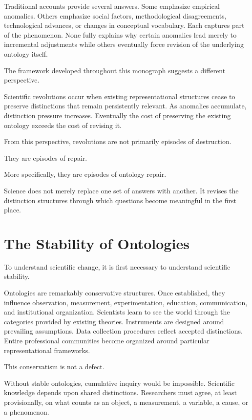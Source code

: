 \documentclass[11pt,oneside,openany]{book}
\begin{document}
Traditional accounts provide several answers. Some emphasize empirical anomalies. Others emphasize social factors, methodological disagreements, technological advances, or changes in conceptual vocabulary. Each captures part of the phenomenon. None fully explains why certain anomalies lead merely to incremental adjustments while others eventually force revision of the underlying ontology itself.

The framework developed throughout this monograph suggests a different perspective.

Scientific revolutions occur when existing representational structures cease to preserve distinctions that remain persistently relevant. As anomalies accumulate, distinction pressure increases. Eventually the cost of preserving the existing ontology exceeds the cost of revising it.

From this perspective, revolutions are not primarily episodes of destruction.

They are episodes of repair.

More specifically, they are episodes of ontology repair.

Science does not merely replace one set of answers with another. It revises the distinction structures through which questions become meaningful in the first place.

\section{The Stability of Ontologies}

To understand scientific change, it is first necessary to understand scientific stability.

Ontologies are remarkably conservative structures. Once established, they influence observation, measurement, experimentation, education, communication, and institutional organization. Scientists learn to see the world through the categories provided by existing theories. Instruments are designed around prevailing assumptions. Data collection procedures reflect accepted distinctions. Entire professional communities become organized around particular representational frameworks.

This conservatism is not a defect.

Without stable ontologies, cumulative inquiry would be impossible. Scientific knowledge depends upon shared distinctions. Researchers must agree, at least provisionally, on what counts as an object, a measurement, a variable, a cause, or a phenomenon.
\end{document}
